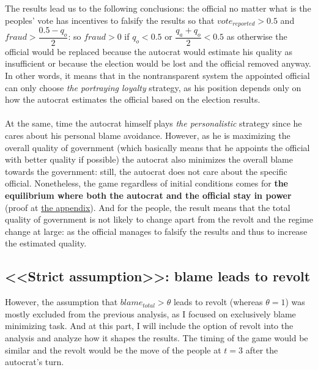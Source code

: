\documentclass[a4paper, 12pt]{article}
\begin{document}
	\noindent The results lead us to the following conclusions: the official no matter what is the peoples' vote has incentives to falsify the results so that $vote_{reported} > 0.5$ and $fraud > \dfrac{0.5 - q_o}{2}$: so $fraud > 0$ if $q_o < 0.5$ or $\dfrac{q_a + q_o}{2} < 0.5$ as otherwise the official would be replaced because the autocrat would estimate his quality as insufficient or because the election would be lost and the official removed anyway. In other words, it means that in the nontransparent system the appointed official can only choose \textit{the portraying loyalty} strategy, as his position depends only on how the autocrat estimates the official based on the election results.
    \\\\	
	\noindent At the same, time the autocrat himself plays \textit{the personalistic} strategy since he cares about his personal blame avoidance. However, as he is maximizing the overall quality of government (which basically means that he appoints the official with better quality if possible) the autocrat also minimizes the overall blame towards the government: still, the autocrat does not care about the specific official. Nonetheless, the game regardless of initial conditions comes for \textbf{the equilibrium where both the autocrat and the official stay in power} (proof at \hyperlink{app1}{the appendix}).	And for the people, the result means that the total quality of government is not likely to change apart from the revolt and the regime change at large: as the official manages to falsify the results and thus to increase the estimated quality.

    \subsection*{<<Strict assumption>>: blame leads to revolt}
	However, the assumption that $blame_{total} > \theta$ leads to revolt (whereas $\theta = 1$) was mostly excluded from the previous analysis, as I focused on exclusively blame minimizing task. And at this part, I will include the option of revolt into the analysis and analyze how it shapes the results. The timing of the game would be similar and the revolt would be the move of the people at $t = 3$ after the autocrat's turn.
    
\end{document}
